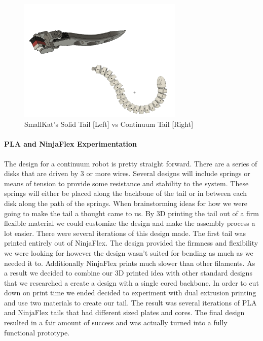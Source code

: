             \begin{figure}[H]
                \centering
                \includegraphics[width=0.7\textwidth]{figures/Tail.png}
                \caption{SmallKat's Solid Tail [Left] vs Continuum Tail [Right]}
                \label{fig:TailComparison}
            \end{figure}
        
        
        \paragraph{PLA and NinjaFlex Experimentation} The design for a continuum robot is pretty straight forward. There are a series of disks that are driven by 3 or more wires. Several designs will include springs or means of tension to provide some resistance and stability to the system. These springs will either be placed along the backbone of the tail or in between each disk along the path of the springs. When brainstorming ideas for how we were going to make the tail a thought came to us. By 3D printing the tail out of a firm flexible material we could customize the design and make the assembly process a lot easier. There were several iterations of this design made. The first tail was printed entirely out of NinjaFlex. The design provided the firmness and flexibility we were looking for however the design wasn't suited for bending as much as we needed it to. Additionally NinjaFlex prints much slower than other filaments. As a result we decided to combine our 3D printed idea with other standard designs that we researched a create a design with a single cored backbone. In order to cut down on print time we ended decided to experiment with dual extrusion printing and use two materials to create our tail. The result was several iterations of PLA and NinjaFlex tails that had different sized plates and cores. The final design resulted in a fair amount of success and was actually turned into a fully functional prototype.
        
